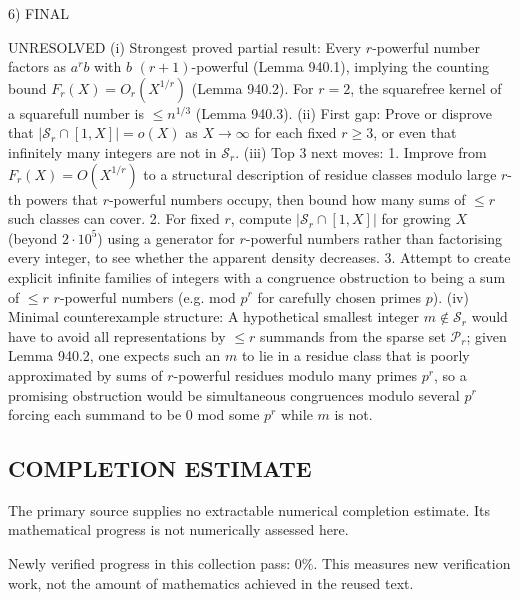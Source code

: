 6) FINAL

UNRESOLVED
(i) Strongest proved partial result: Every \(r\)-powerful number factors as \(a^r b\) with \(b\) \((r+1)\)-powerful (Lemma 940.1), implying the counting bound \(F_r(X)=O_r(X^{1/r})\) (Lemma 940.2). For \(r=2\), the squarefree kernel of a squarefull number is \(\le n^{1/3}\) (Lemma 940.3).
(ii) First gap: Prove or disprove that \(|\mathcal S_r\cap[1,X]|=o(X)\) as \(X\to\infty\) for each fixed \(r\ge 3\), or even that infinitely many integers are not in \(\mathcal S_r\).
(iii) Top 3 next moves:
  1. Improve from \(F_r(X)=O(X^{1/r})\) to a structural description of residue classes modulo large \(r\)-th powers that \(r\)-powerful numbers occupy, then bound how many sums of \(\le r\) such classes can cover.
  2. For fixed \(r\), compute \(|\mathcal S_r\cap[1,X]|\) for growing \(X\) (beyond \(2\cdot 10^5\)) using a generator for \(r\)-powerful numbers rather than factorising every integer, to see whether the apparent density decreases.
  3. Attempt to create explicit infinite families of integers with a congruence obstruction to being a sum of \(\le r\) \(r\)-powerful numbers (e.g. mod \(p^r\) for carefully chosen primes \(p\)).
(iv) Minimal counterexample structure: A hypothetical smallest integer \(m\notin\mathcal S_r\) would have to avoid all representations by \(\le r\) summands from the sparse set \(\mathcal P_r\); given Lemma 940.2, one expects such an \(m\) to lie in a residue class that is poorly approximated by sums of \(r\)-powerful residues modulo many primes \(p^r\), so a promising obstruction would be simultaneous congruences modulo several \(p^r\) forcing each summand to be 0 mod some \(p^r\) while \(m\) is not.



\subsection*{COMPLETION ESTIMATE}
The primary source supplies no extractable numerical completion estimate. Its mathematical progress is not numerically assessed here.

Newly verified progress in this collection pass: $0\%$. This measures new verification work, not the amount of mathematics achieved in the reused text.
